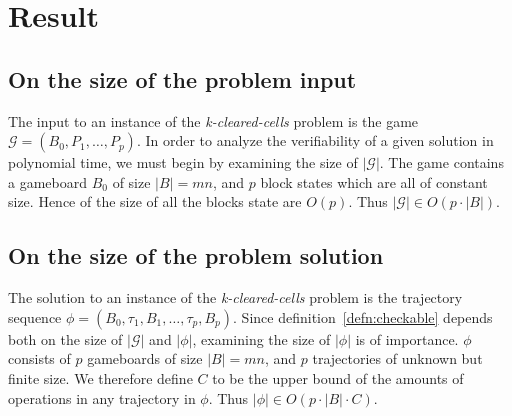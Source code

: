 \section{Result}

\subsection{On the size of the problem input}
The input to an instance of the \textit{k-cleared-cells} problem is the game $\mathcal{G} = (B_0, P_1, \ldots, P_p)$. In order to analyze the verifiability of a given solution in polynomial time, we must begin by examining the size of $|\mathcal{G}|$. The game contains a gameboard $B_0$ of size $|B| = mn$, and $p$ block states which are all of constant size. Hence of the size of all the blocks state are $O(p)$. Thus $|\mathcal{G}| \in O(p \cdot |B|)$.

\subsection{On the size of the problem solution}
The solution to an instance of the \textit{k-cleared-cells} problem is the trajectory sequence $\phi=(B_0, \tau_1, B_1, \ldots ,\tau_p, B_p)$. Since definition~\ref{defn:checkable} depends both on the size of $|\mathcal{G}|$ and $|\phi|$, examining the size of $|\phi|$ is of importance. $\phi$ consists of $p$ gameboards of size $|B| = mn$, and $p$ trajectories of unknown but finite size. We therefore define $C$ to be the upper bound of the amounts of operations in any trajectory in $\phi$. Thus $|\phi| \in O(p \cdot |B| \cdot C)$.




